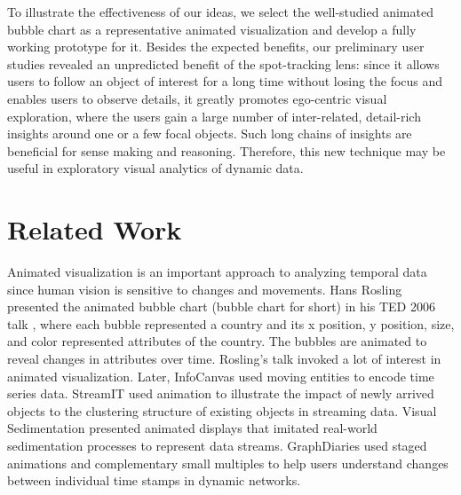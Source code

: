\documentclass[review]{vgtc}                 %
\begin{document}
To illustrate the effectiveness of our ideas, we select the well-studied animated bubble chart as a representative animated visualization and develop a fully working prototype for it. Besides the expected benefits, our preliminary user studies revealed an unpredicted benefit of the spot-tracking lens: since it allows users to follow an object of interest for a long time without losing the focus and enables users to observe details, it greatly promotes ego-centric visual exploration, where the users gain a large number of inter-related, detail-rich insights around one or a few focal objects. Such long chains of insights are beneficial for sense making and reasoning. Therefore, this new technique may be useful in exploratory visual analytics of dynamic data.

\section{ Related Work}
\label{sec:relatedwork}
Animated visualization is an important approach to analyzing temporal data since human vision is sensitive to changes and movements. Hans Rosling presented the animated bubble chart (bubble chart for short) in his TED 2006 talk \cite{rosling_gapminder_2006}, where each bubble represented a country and its x position, y position, size, and color represented attributes of the country. The bubbles are animated to reveal changes in attributes over time. Rosling's talk invoked a lot of interest in animated visualization. Later, InfoCanvas \cite{miller_infocanvas:_2001} used moving entities to encode time series data. StreamIT \cite{alsakran2011streamit} used animation to illustrate the impact of newly arrived objects to the clustering structure of existing objects in streaming data. Visual Sedimentation \cite{huron2013visual} presented animated displays that imitated real-world sedimentation processes to represent data streams. GraphDiaries \cite{bach2014graphdiaries} used staged animations and complementary small multiples to help users understand changes between individual time stamps in dynamic networks.
\end{document}
